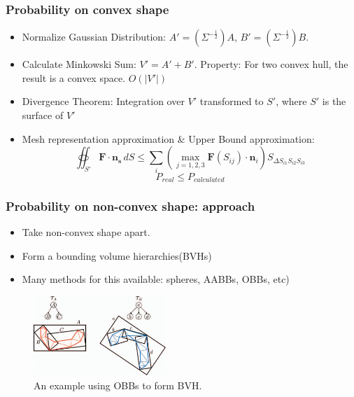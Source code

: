 \documentclass{beamer}
\begin{document}
\begin{frame}
	\frametitle{Probability on convex shape}
	\begin{itemize}
		\item Normalize Gaussian Distribution: $A' = (\Sigma^{-\frac{1}{2}})A$, $B' = (\Sigma^{-\frac{1}{2}})B$.
		\item Calculate Minkowski Sum: $V' = A' + B'$. Property: For two convex hull, the result is a convex space. $O(|V'|)$
		\item Divergence Theorem: Integration over $V'$ transformed to $S'$, where $S'$ is the surface of $V'$
		\item Mesh representation approximation \& Upper Bound approximation:
		      $$\oiint_{S'}\mathbf{F}\cdot\mathbf{n_s}\,dS \leq \sum_i(\max_{j = 1,2,3}\mathbf{F}(S_{ij})\cdot\mathbf{n}_i)S_{\Delta S_{i1}S_{i2}S_{i3}}$$
		      $$P_{real} \leq P_{calculated}$$
	\end{itemize}
\end{frame}

\begin{frame}
	\frametitle{Probability on non-convex shape: approach}
	\begin{itemize}
		\item Take non-convex shape apart.
		\item Form a bounding volume hierarchies(BVHs)
		\item Many methods for this available: spheres, AABBs, OBBs, etc)
	\end{itemize}
	\begin{figure}
		\includegraphics[width=5cm]{imgs/a.png}
		\caption{An example using OBBs to form BVH.}
	\end{figure}
\end{frame}
\end{document}
